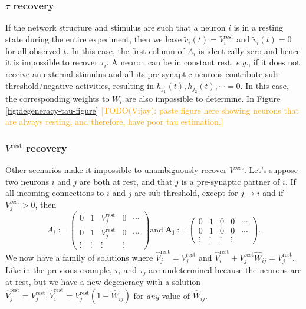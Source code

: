 \documentclass{article}
\newcommand{\comment}[1]{\textcolor{orange}{[#1]}}
\def\eg{{\it e.g.}}
\def\vrest{V^{\mathrm{rest}}}
\begin{document}
\subsubsection*{$\tau$ recovery}

If the network structure and stimulus are such that a neuron $i$ is in a resting state during the entire experiment, then we have $\tilde{v}_i(t) = \vrest_i$ and $\dot{\tilde{v}}_i(t) = 0$ for all observed $t$. In this case, the first column of $A_i$ is identically zero and hence it is impossible to recover $\tau_i$. A neuron can be in constant rest, \eg, if it does not receive an external stimulus and all its pre-synaptic neurons contribute sub-threshold/negative activities, resulting in $h_{j_1}(t), h_{j_2}(t), \cdots = 0$. In this case, the corresponding weights to $W_i$ are also impossible to determine. In Figure \ref{fig:degeneracy-tau-figure} \comment{TODO(Vijay): paste figure here showing neurons that are always resting, and therefore, have poor tau estimation.}

\subsubsection*{$\vrest$ recovery}

Other scenarios make it impossible to unambiguously recover $\vrest$. 
Let's suppose two neurons $i$ and $j$ are both at rest, and that $j$ is a pre-synaptic partner of $i$. If all incoming connections to $i$ and $j$ are sub-threshold, except for $j\rightarrow i$ and if $\vrest_j > 0$, then
\begin{equation}
    A_i := \begin{pmatrix}
        0 & 1 & \vrest_j & 0 & \cdots  \\
        0 & 1 & \vrest_j & 0 & \cdots  \\
        \vdots & \vdots & \vdots &\vdots & 
    \end{pmatrix} \text{and} \ \mathbf{A_j} := \begin{pmatrix}
        0 & 1 & 0 & 0 & \cdots  \\
        0 & 1 & 0 & 0 & \cdots  \\
        \vdots & \vdots & \vdots &\vdots & 
    \end{pmatrix}.
\end{equation}
We now have a family of solutions where $\hat{V}^{\mathrm{rest}}_j = \vrest_j $ and $\hat{V}^{\mathrm{rest}}_i + \vrest_j\hat{W}_{ij} = \vrest_j$. Like in the previous example, $\tau_i$ and $\tau_j$ are undetermined because the neurons are at rest, but we have a new degeneracy with a solution $\hat{V}^{\mathrm{rest}}_j = \vrest_j, \hat{V}^{\mathrm{rest}}_i = \vrest_j ( 1 - \hat{W}_{ij} )$ for \emph{any} value of $\hat{W}_{ij}$.%
\end{document}
